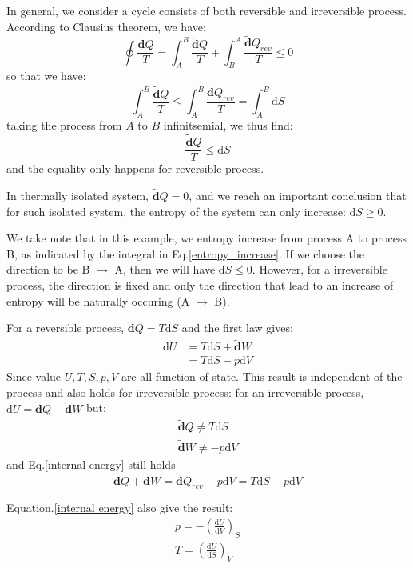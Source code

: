 \documentclass{article}
\newcommand{\dbar}{\mathbf{\tilde{d}}}
\newcommand{\dnor}{\text{d}}
\begin{document}
In general, we consider a cycle consists of both reversible and 
irreversible process. According to Clausius theorem, we have:
\begin{equation}
    \oint \frac{\dbar Q}{T} = \int_A^B \frac{\dbar Q}{T} + \int_B^A \frac{\dbar Q_{rev}}{T} \le 0
\end{equation}
so that we have:
\begin{equation}
    \int_A^B \frac{\dbar Q}{T} \le \int_A^B \frac{\dbar Q_{rev}}{T} = \int_A^B \dnor S  \label{entropy_increase}
\end{equation}
taking the process from $A$ to $B$ infinitsemial, we thus find:
\begin{equation}
    \frac{\dbar Q}{T} \le \dnor S
\end{equation}
and the equality only happens for reversible process.

In thermally isolated system, $\dbar Q = 0$, and we reach an
important conclusion that for such isolated system, the entropy
of the system can only increase: $ \dnor S \ge 0$.

We take note that in this example, we entropy increase from process A to process B, 
as indicated by the integral in Eq.\ref{entropy_increase}. If we choose the direction
to be B $\to$ A, then we will have  $ \dnor S \le 0$. However, for a irreversible process,
the direction is fixed and only the direction that lead to an increase of entropy
will be naturally occuring (A $\to$ B). 

For a reversible process, $\dbar Q = T \dnor S$ and the first law gives:
\begin{align}
    \dnor U & = T \dnor S + \dbar W \\
            & = T \dnor S - p \dnor V \label{internal energy}
\end{align}
Since value $U, T, S, p, V$ are all function of state. This 
result is independent of the process and also holds for 
irreversible process: 
for an irreversible process, $\dnor U = \dbar Q + \dbar W$
but:
\begin{gather}
    \dbar Q \neq  T \dnor S \\
    \dbar W \neq  - p \dnor V 
\end{gather}
and Eq.\ref{internal energy} still holds
\begin{equation}
    \dbar Q + \dbar W = \dbar Q_{rev} - p \dnor V = T \dnor S - p \dnor V
\end{equation}

Equation.\ref{internal energy} also give the result:
\begin{gather}
    p = - \left(\frac{\dnor U}{\dnor V}\right)_S \\
    T = \left(\frac{\dnor U}{\dnor S}\right)_V
\end{gather}
\end{document}
